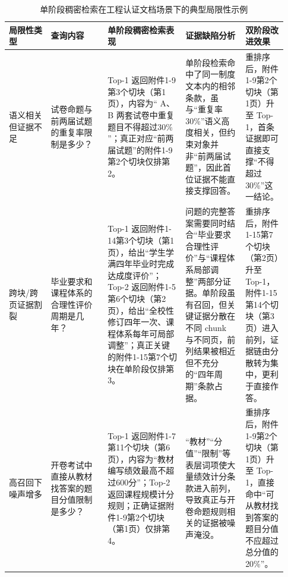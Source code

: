 \begin{table}[htbp]
\centering
\caption{单阶段稠密检索在工程认证文档场景下的典型局限性示例}
\label{tab:dense_limit_cases}
\small
\setlength{\tabcolsep}{4pt}
\renewcommand{\arraystretch}{1.25}
\begin{tabular}{p{0.14\linewidth} p{0.19\linewidth} p{0.26\linewidth} p{0.20\linewidth} p{0.14\linewidth}}
\hline
局限性类型 & 查询内容 & 单阶段稠密检索表现 & 证据缺陷分析 & 双阶段改进效果 \\
\hline
语义相关但证据不足 &
试卷命题与前两届试题的重复率限制是多少？ &
Top-1 返回附件1-9第3个切块（第1页），内容为“ A、B 两套试卷中重复题目不得超过30\% ”；真正对应“前两届试题”的附件1-9第2个切块仅排第2。 &
单阶段检索命中了同一制度文本内的相邻条款，虽与“重复率 30\%”语义高度相关，但约束对象并非“前两届试题”，因此首位证据不能直接支撑回答。 &
重排序后，附件1-9第2个切块（第1页）升至 Top-1，首条证据即可直接支撑“不得超过30\%”这一结论。 \\
\hline
跨块/跨页证据割裂 &
毕业要求和课程体系的合理性评价周期是几年？ &
Top-1 返回附件1-14第3个切块（第1页），给出“学生学满四年毕业时完成达成度评价”；Top-2 返回附件1-5第6个切块（第2页），给出“全校性修订四年一次、课程体系每年可局部调整”；真正关键的附件1-15第7个切块在单阶段仅排第3。 &
问题的完整答案需要同时结合“毕业要求合理性评价”与“课程体系局部调整”两部分证据。单阶段虽有召回，但关键证据分散在不同 chunk 与不同页，前列结果被相近但不充分的“四年周期”条款占据。 &
重排序后，附件1-15第7个切块（第2页）升至 Top-1，附件1-15第14个切块（第3页）进入前列，证据链由分散转为集中，更利于直接作答。 \\
\hline
高召回下噪声增多 &
开卷考试中直接从教材找答案的题目分值限制是多少？ &
Top-1 返回附件1-7第11个切块（第6页），内容为“教材编写绩效最高不超过600分”；Top-2 返回课程规模计分规则；正确证据附件1-9第2个切块（第1页）仅排第4。 &
“教材”“分值”“限制”等表层词项使大量绩效计分条款进入前列，导致真正与开卷命题规则相关的证据被噪声淹没。 &
重排序后，附件1-9第2个切块（第1页）升至 Top-1，直接命中“可从教材找到答案的题目分值不应超过总分值的20\%”。 \\
\hline
\end{tabular}
\end{table}
